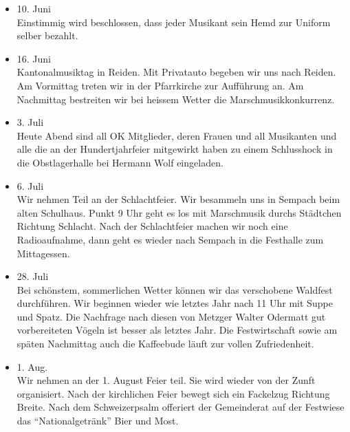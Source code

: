 \begin{history}
\begin{itemize}
        \item 10. Juni\\
              Einstimmig wird beschlossen, dass jeder Musikant sein Hemd zur Uniform
              selber bezahlt.

        \item 16. Juni\\
              Kantonalmusiktag in Reiden. Mit Privatauto begeben wir uns nach Reiden.
              Am Vormittag treten wir in der Pfarrkirche zur Aufführung an. Am
              Nachmittag bestreiten wir bei heissem Wetter die Marschmusikkonkurrenz.

        \item 3. Juli\\
              Heute Abend sind all OK Mitglieder, deren Frauen und all Musikanten und
              alle die an der Hundertjahrfeier mitgewirkt haben zu einem Schlusshock
              in die Obstlagerhalle bei Hermann Wolf eingeladen.

        \item 6. Juli\\
              Wir nehmen Teil an der Schlachtfeier. Wir besammeln uns in Sempach beim
              alten Schulhaus. Punkt 9 Uhr geht es los mit Marschmusik durchs
              Städtchen Richtung Schlacht. Nach der Schlachtfeier machen wir noch eine
              Radioaufnahme, dann geht es wieder nach Sempach in die Festhalle zum
              Mittagessen.

        \item 28. Juli\\
              Bei schönstem, sommerlichen Wetter können wir das verschobene Waldfest
              durchführen. Wir beginnen wieder wie letztes Jahr nach 11 Uhr mit Suppe
              und Spatz. Die Nachfrage nach diesen von Metzger Walter Odermatt gut
              vorbereiteten Vögeln ist besser als letztes Jahr. Die Festwirtschaft
              sowie am späten Nachmittag auch die Kaffeebude läuft zur vollen
              Zufriedenheit.

        \item 1. Aug.\\
              Wir nehmen an der 1. August Feier teil. Sie wird wieder von der Zunft
              organisiert. Nach der kirchlichen Feier bewegt sich ein Fackelzug
              Richtung Breite. Nach dem Schweizerpsalm offeriert der Gemeinderat auf
              der Festwiese das \enquote{Nationalgetränk} Bier und Most.


\end{itemize}
\end{history}
